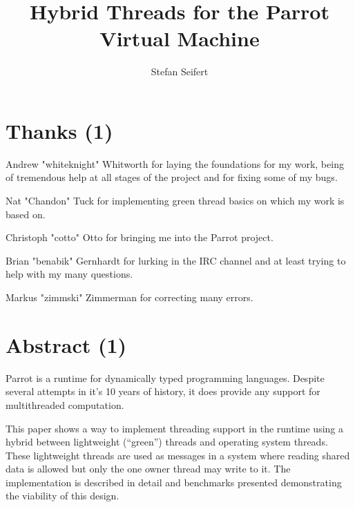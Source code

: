\documentclass[bachelor,english]{hgbthesis}
\begin{document}
\title{Hybrid Threads for the Parrot Virtual Machine}

\author{Stefan Seifert}


\frontmatter
\maketitle
\tableofcontents

\chapter{Thanks (1)}

Andrew "whiteknight" Whitworth for laying the foundations for my work, being of tremendous help at all stages of the project and for fixing some of my bugs.

Nat "Chandon" Tuck for implementing green thread basics on which my work is based on.

Christoph "cotto" Otto for bringing me into the Parrot project.

Brian "benabik" Gernhardt for lurking in the IRC channel and at least trying to help with my many questions.

Markus "zimmski" Zimmerman for correcting many errors.

\chapter{Abstract (1)}

Parrot is a runtime for dynamically typed programming languages. Despite several attempts in it's 10 years of history, it does provide any support for multithreaded computation.

This paper shows a way to implement threading support in the runtime using a hybrid between lightweight (``green'') threads and operating system threads. These lightweight threads are used as messages in a system where reading shared data is allowed but only the one owner thread may write to it. The implementation is described in detail and benchmarks presented demonstrating the viability of this design.
\end{document}
